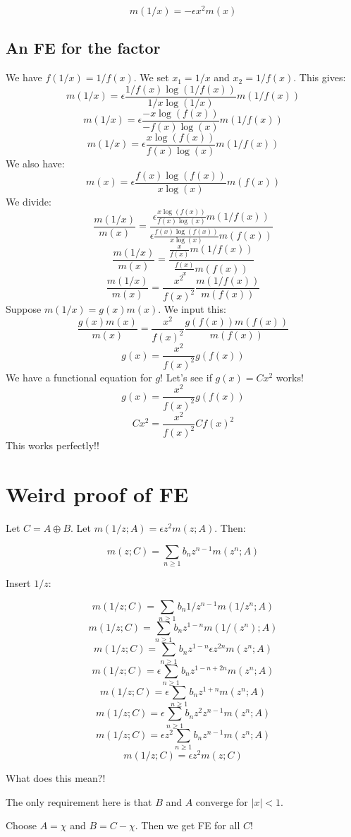 \documentclass[a4paper]{amsart}
\begin{document}
$$m(1/x) = -\epsilon x^2 m(x)$$


\subsection{An FE for the factor}

We have $f(1/x) = 1/f(x)$. We set $x_1 = 1/x$ and $x_2 = 1/f(x)$. This gives:
$$m(1/x) = \epsilon\frac{1/f(x)\log(1/f(x))}{1/x\log(1/x)}m(1/f(x))$$
$$m(1/x) = \epsilon\frac{-x\log(f(x))}{-f(x)\log(x)}m(1/f(x))$$
$$m(1/x) = \epsilon\frac{x\log(f(x))}{f(x)\log(x)}m(1/f(x))$$
We also have:
$$m(x) = \epsilon\frac{f(x)\log(f(x))}{x\log(x)} m(f(x))$$
We divide:
$$\frac{m(1/x)}{m(x)} = \frac{\epsilon\frac{x\log(f(x))}{f(x)\log(x)}m(1/f(x))}{\epsilon\frac{f(x)\log(f(x))}{x\log(x)} m(f(x))}$$
$$\frac{m(1/x)}{m(x)} = \frac{\frac{x}{f(x)}m(1/f(x))}{\frac{f(x)}{x} m(f(x))}$$
$$\frac{m(1/x)}{m(x)} = \frac{x^2}{f(x)^2} \frac{m(1/f(x))}{m(f(x))}$$
Suppose $m(1/x) = g(x)m(x)$. We input this:
$$\frac{g(x)m(x)}{m(x)} = \frac{x^2}{f(x)^2} \frac{g(f(x))m(f(x))}{m(f(x))}$$
$$g(x) = \frac{x^2}{f(x)^2} g(f(x))$$
We have a functional equation for $g$! Let's see if $g(x) = Cx^2$ works!
$$g(x) = \frac{x^2}{f(x)^2} g(f(x))$$
$$Cx^2 = \frac{x^2}{f(x)^2} Cf(x)^2$$
This works perfectly!!



\section{Weird proof of FE}
Let $C = A \oplus B$. Let $m(1/z; A) = \epsilon z^2 m(z; A)$. Then: 

$$m(z; C) = \sum_{n \ge 1} b_n z^{n - 1} m(z^n; A)$$

Insert $1/z$:

$$m(1/z; C) = \sum_{n \ge 1} b_n 1/z^{n - 1} m(1/z^n; A)$$
$$m(1/z; C) = \sum_{n \ge 1} b_n z^{1 - n} m(1/(z^n); A)$$
$$m(1/z; C) = \sum_{n \ge 1} b_n z^{1 - n} \epsilon z^{2n} m(z^n; A)$$
$$m(1/z; C) = \epsilon \sum_{n \ge 1} b_n z^{1 - n + 2n} m(z^n; A)$$
$$m(1/z; C) = \epsilon \sum_{n \ge 1} b_n z^{1 + n} m(z^n; A)$$
$$m(1/z; C) = \epsilon \sum_{n \ge 1} b_n z^2 z^{n - 1} m(z^n; A)$$
$$m(1/z; C) = \epsilon z^2 \sum_{n \ge 1} b_n z^{n - 1} m(z^n; A)$$ 
$$m(1/z; C) = \epsilon z^2 m(z; C)$$

What does this mean?!

The only requirement here is that $B$ and $A$ converge for $|x| < 1$.

Choose $A = \chi$ and $B = C - \chi$. Then we get FE for all $C$!
\end{document}

